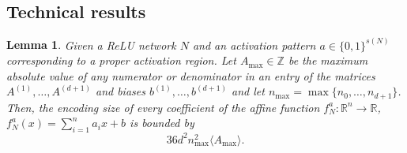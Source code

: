 \documentclass{article}
\newtheorem{lemma}[theorem]{Lemma}
\begin{document}
\subsection{Technical results}
\begin{lemma}
\label{lem:coeffs_are_polynomial}
    Given a ReLU network $N$ and an activation pattern $a\in \{0,1\}^{s(N)}$ corresponding to a proper activation region. Let $A_{\max}\in \mathbb{Z}$ be the maximum absolute value of any numerator or denominator in an entry of the matrices $A^{(1)},\dots, A^{(d+1)}$ and biases $b^{(1)},\dots, b^{(d+1)}$ and let $n_{\max}=\max\{n_0,\dots,n_{d+1}\}$.
    Then, the encoding size of every coefficient of the affine function $f_N^a:\mathbb{R}^n\to \mathbb{R}$, $f_N^a(x)=\sum_{i=1}^n a_ix + b$ is bounded by
    \[
    36d^2n_{\max}^2\langle A_{\max}\rangle.
    \]
\end{lemma}
\end{document}
